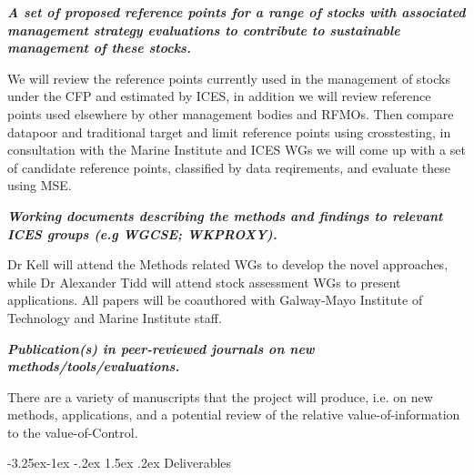 \documentclass[a4paper, 10pt]{article}
\makeatletter
\renewcommand{\subsection}{\@startsection{subsection}{2}{\z@}%
  {-3.25ex\@plus -1ex \@minus -.2ex}%
  {1.5ex \@plus .2ex}%
  {\normalfont\bfseries\slshape}}
\makeatother
\begin{document}
\textit{\textbf{A set of proposed reference points for a range of stocks with associated management strategy evaluations to contribute to sustainable management of these stocks.}}

We will review the reference points currently used in the management of stocks under the CFP and estimated by ICES, in addition we will review reference points used elsewhere by other management bodies and RFMOs. Then compare datapoor and traditional target and limit reference points using crosstesting, in consultation with the Marine Institute and ICES WGs we will come up with a set of candidate reference points, classified by data reqirements, and evaluate these using MSE.

\textit{\textbf{Working documents describing the methods and findings to relevant ICES groups (e.g WGCSE; WKPROXY).}}

Dr Kell will attend the Methods related WGs to develop the novel approaches, while Dr Alexander Tidd will attend stock assessment WGs to present applications. All papers will be coauthored with Galway-Mayo Institute of Technology and Marine Institute staff.


\textit{\textbf{ Publication(s) in peer-reviewed journals on new methods/tools/evaluations.}}

There are a variety of manuscripts that the project will produce, i.e. on new methods, applications, and a potential review of the relative value-of-information to the value-of-Control.

\subsection{Deliverables}
\end{document}
